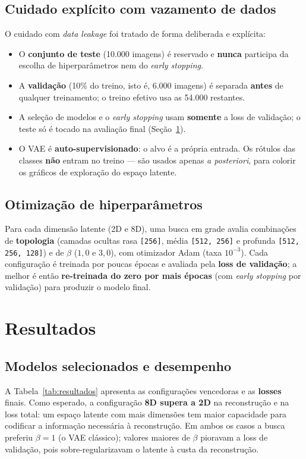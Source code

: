 \documentclass[11pt,a4paper]{article}
\begin{document}
\subsection{Cuidado explícito com vazamento de dados}
O cuidado com \textit{data leakage} foi tratado de forma deliberada e explícita:
\begin{itemize}
    \item O \textbf{conjunto de teste} (10.000 imagens) é reservado e \textbf{nunca} participa da escolha de hiperparâmetros nem do \textit{early stopping}.
    \item A \textbf{validação} (10\% do treino, isto é, 6.000 imagens) é separada \textbf{antes} de qualquer treinamento; o treino efetivo usa as 54.000 restantes.
    \item A seleção de modelos e o \textit{early stopping} usam \textbf{somente} a loss de validação; o teste só é tocado na avaliação final (Seção~\ref{sec:resultados}).
    \item O VAE é \textbf{auto-supervisionado}: o alvo é a própria entrada. Os rótulos das classes \textbf{não} entram no treino --- são usados apenas \textit{a posteriori}, para colorir os gráficos de exploração do espaço latente.
\end{itemize}

\subsection{Otimização de hiperparâmetros}
Para cada dimensão latente (2D e 8D), uma busca em grade avalia combinações de \textbf{topologia} (camadas ocultas rasa \texttt{[256]}, média \texttt{[512, 256]} e profunda \texttt{[512, 256, 128]}) e de \textbf{$\beta$} ($1{,}0$ e $3{,}0$), com otimizador Adam (taxa $10^{-3}$). Cada configuração é treinada por poucas épocas e avaliada pela \textbf{loss de validação}; a melhor é então \textbf{re-treinada do zero por mais épocas} (com \textit{early stopping} por validação) para produzir o modelo final.

\section{Resultados}
\label{sec:resultados}

\subsection{Modelos selecionados e desempenho}
A Tabela~\ref{tab:resultados} apresenta as configurações vencedoras e as \textbf{losses} finais. Como esperado, a configuração \textbf{8D supera a 2D} na reconstrução e na loss total: um espaço latente com mais dimensões tem maior capacidade para codificar a informação necessária à reconstrução. Em ambos os casos a busca preferiu $\beta = 1$ (o VAE clássico); valores maiores de $\beta$ pioravam a loss de validação, pois sobre-regularizavam o latente à custa da reconstrução.
\end{document}
